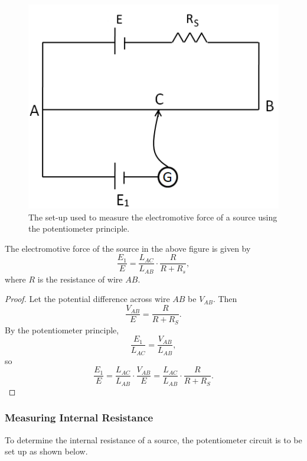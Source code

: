 \begin{figure}[H]
    \centering
    \includegraphics[scale=0.5]{media/Potentiometer Circuit - emf.png}
    \caption{The set-up used to measure the electromotive force of a source using the potentiometer principle.}
\end{figure}

\begin{proposition}
    The electromotive force of the source in the above figure is given by \[\frac{E_1}{E} = \frac{L_{AC}}{L_{AB}} \cdot \frac{R}{R + R_s},\] where $R$ is the resistance of wire $AB$.
\end{proposition}
\begin{proof}
    Let the potential difference across wire $AB$ be $V_{AB}$. Then \[\frac{V_{AB}}{E} = \frac{R}{R + R_S}.\] By the potentiometer principle, \[\frac{E_1}{L_{AC}} = \frac{V_{AB}}{L_{AB}},\] so \[\frac{E_1}{E} = \frac{L_{AC}}{L_{AB}} \cdot \frac{V_{AB}}{E} = \frac{L_{AC}}{L_{AB}} \cdot \frac{R}{R + R_S}.\]
\end{proof}

\subsubsection{Measuring Internal Resistance}

To determine the internal resistance of a source, the potentiometer circuit is to be set up as shown below.

